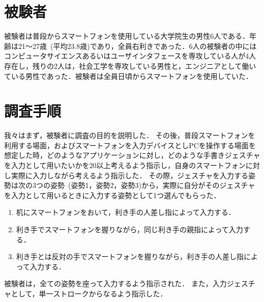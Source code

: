 \section{被験者}
被験者は普段からスマートフォンを使用している大学院生の男性6人である．年齢は21〜27歳~(平均23.8歳)であり，全員右利きであった．6人の被験者の中にはコンピュータサイエンスあるいはユーザインタフェースを専攻している人が4人存在し，残りの2人は，社会工学を専攻している男性と，エンジニアとして働いている男性であった．被験者は全員日頃からスマートフォンを使用していた．



\section{調査手順}
我々はまず，被験者に調査の目的を説明した．
その後，普段スマートフォンを利用する場面，およびスマートフォンを入力デバイスとしPCを操作する場面を想定した時，どのようなアプリケーションに対し，どのような手書きジェスチャを入力として用いたいかを20以上考えるよう指示し，自身のスマートフォンに対し実際に入力しながら考えるよう指示した．
その際，ジェスチャを入力する姿勢は次の3つの姿勢~(姿勢1，姿勢2，姿勢3)から，実際に自分がそのジェスチャを入力として用いるときに入力する姿勢として1つ選んでもらった．
\begin{enumerate}
\item 机にスマートフォンをおいて，利き手の人差し指によって入力する．
\item 利き手でスマートフォンを握りながら，同じ利き手の親指によって入力する．
\item 利き手とは反対の手でスマートフォンを握りながら，利き手の人差し指によって入力する．
\end{enumerate}
被験者は，全ての姿勢を座って入力するよう指示された．
また，入力ジェスチャとして，単一ストロークからなるよう指示した．

